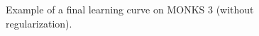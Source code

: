 \documentclass[11pt,twoside]{article}
\begin{document}
    \begin{figure}[htbp]
        \centering
        \begin{subfigure}{0.90\textwidth}
            \caption{}
            \label{fig:monks_3_MSE}
        \end{subfigure}
        \begin{subfigure}{0.90\textwidth}
            \caption{}
            \label{fig:monks_3_ACC}
        \end{subfigure}
        \caption{Example of a final learning curve on MONKS 3 (without regularization).}
        \label{fig:monks_3_final_results}
    \end{figure}
\end{document}
